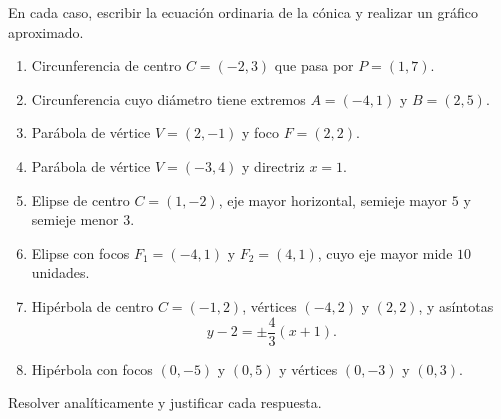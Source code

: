 \documentclass[11pt]{article}
\def\identacion{-2.5mm}%
\begin{document}
\bigskip

\begin{mdframed}[style=EjerSty,frametitle={Actividad 2: construir la ecuación}]
En cada caso, escribir la ecuación ordinaria de la cónica y realizar un gráfico aproximado.
\end{mdframed}

\begin{enumerate}[\hspace*{\identacion}1)]
\item Circunferencia de centro $C=(-2,3)$ que pasa por $P=(1,7)$.

\item Circunferencia cuyo diámetro tiene extremos $A=(-4,1)$ y $B=(2,5)$.

\item Parábola de vértice $V=(2,-1)$ y foco $F=(2,2)$.

\item Parábola de vértice $V=(-3,4)$ y directriz $x=1$.

\item Elipse de centro $C=(1,-2)$, eje mayor horizontal, semieje mayor $5$ y semieje menor $3$.

\item Elipse con focos $F_1=(-4,1)$ y $F_2=(4,1)$, cuyo eje mayor mide $10$ unidades.

\item Hipérbola de centro $C=(-1,2)$, vértices $(-4,2)$ y $(2,2)$, y asíntotas
\[
y-2=\pm\frac{4}{3}(x+1).
\]

\item Hipérbola con focos $(0,-5)$ y $(0,5)$ y vértices $(0,-3)$ y $(0,3)$.
\end{enumerate}

\bigskip

\begin{mdframed}[style=EjerSty,frametitle={Actividad 3: intersecciones y posición relativa}]
Resolver analíticamente y justificar cada respuesta.
\end{mdframed}
\end{document}
